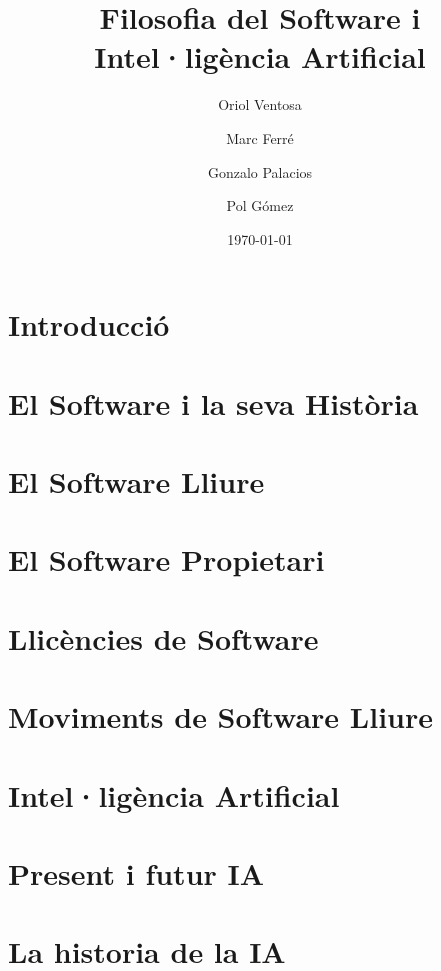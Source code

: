 \documentclass[a4paper,12pt]{report}
\begin{document}


\title{
	{\bf Filosofia del Software i Intel·ligència Artificial}
}
\author{
	Oriol Ventosa \and
	Marc Ferré \and
	Gonzalo Palacios \and
	Pol Gómez
}
\date{\today}
\maketitle

\tableofcontents

\chapter{Introducció}


\chapter{El Software i la seva Història}


\chapter{El Software Lliure}


\chapter{El Software Propietari}


\chapter{Llicències de Software}


\chapter{Moviments de Software Lliure}


\chapter{Intel·ligència Artificial}


\chapter{Present i futur IA}


\chapter{La historia de la IA}




\end{document}
